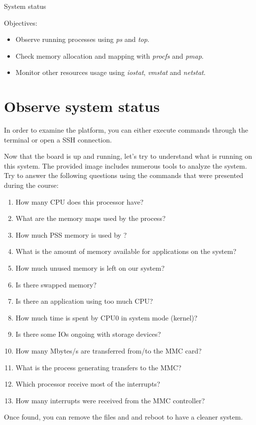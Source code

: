 \subchapter
{System status}
{Objectives:
  \begin{itemize}
    \item Observe running processes using {\em ps} and {\em top}.
    \item Check memory allocation and mapping with {\em procfs} and {\em pmap}.
    \item Monitor other resources usage using {\em iostat}, {\em vmstat} and {\em netstat}.
  \end{itemize}
}

\section{Observe system status}

In order to examine the platform, you can either execute commands through the
 terminal or open a SSH connection.

Now that the board is up and running, let's try to understand what is running
on this system. The provided image includes numerous tools to analyze the
system. Try to answer the following questions using the commands that were
presented during the course:

\begin{enumerate}
  \item How many CPU does this processor have?
  \item What are the memory maps used by the  process?
  \item How much PSS memory is used by ?
  \item What is the amount of memory available for applications on the system?
  \item How much unused memory is left on our system?
  \item Is there swapped memory?
  \item Is there an application using too much CPU?
  \item How much time is spent by CPU0 in system mode (kernel)?
  \item Is there some IOs ongoing with storage devices?
  \item How many Mbytes/s are transferred from/to the MMC card?
  \item What is the process generating transfers to the MMC?
  \item Which processor receive most of the interrupts?
  \item How many interrupts were received from the MMC controller?
\end{enumerate}

Once found, you can remove the files  and
 and reboot to have a cleaner system.
